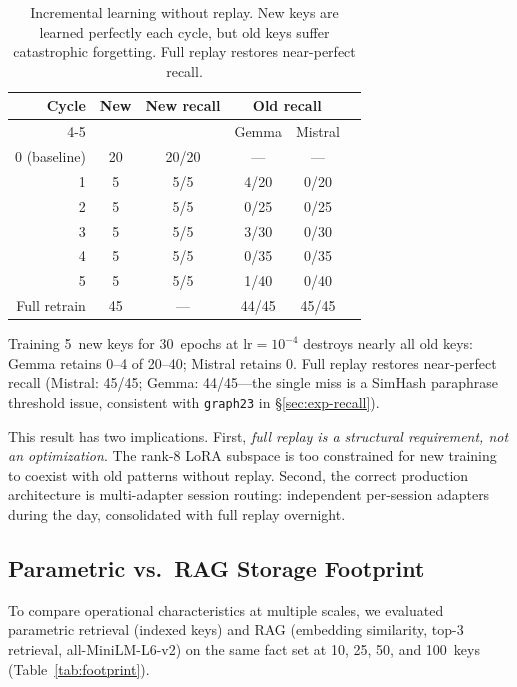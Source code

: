 \documentclass[11pt]{article}
\begin{document}
\begin{table}[t]
\centering
\caption{Incremental learning without replay. New keys are learned perfectly each cycle, but old keys suffer catastrophic forgetting. Full replay restores near-perfect recall.}
\label{tab:incremental-noreplay}
\small
\begin{tabular}{@{}rccccc@{}}
\toprule
\textbf{Cycle} & \textbf{New} & \textbf{New recall} & \multicolumn{2}{c}{\textbf{Old recall}} \\
\cmidrule(lr){4-5}
& & & Gemma & Mistral \\
\midrule
0 (baseline) & 20 & 20/20 & --- & --- \\
1 & 5 & 5/5 & 4/20 & 0/20 \\
2 & 5 & 5/5 & 0/25 & 0/25 \\
3 & 5 & 5/5 & 3/30 & 0/30 \\
4 & 5 & 5/5 & 0/35 & 0/35 \\
5 & 5 & 5/5 & 1/40 & 0/40 \\
\midrule
Full retrain & 45 & --- & 44/45 & 45/45 \\
\bottomrule
\end{tabular}
\end{table}
Training 5~new keys for 30~epochs at $\text{lr}=10^{-4}$ destroys nearly all old keys: Gemma retains 0--4 of 20--40; Mistral retains 0.
Full replay restores near-perfect recall (Mistral: 45/45; Gemma: 44/45---the single miss is a SimHash paraphrase threshold issue, consistent with \texttt{graph23} in \S\ref{sec:exp-recall}).

This result has two implications.
First, \emph{full replay is a structural requirement, not an optimization}.
The rank-8 LoRA subspace is too constrained for new training to coexist with old patterns without replay.
Second, the correct production architecture is multi-adapter session routing: independent per-session adapters during the day, consolidated with full replay overnight.

\subsection{Parametric vs.\ RAG Storage Footprint}
\label{sec:exp-footprint}

To compare operational characteristics at multiple scales, we evaluated parametric retrieval (indexed keys) and RAG (embedding similarity, top-3 retrieval, all-MiniLM-L6-v2) on the same fact set at 10, 25, 50, and 100~keys (Table~\ref{tab:footprint}).
\end{document}
